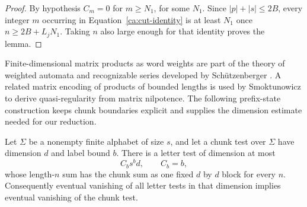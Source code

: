 \begin{proof}
By hypothesis $C_m=0$ for $m\geq N_1$, for some $N_1$.  Since
$|p|+|s|\leq2B$, every integer $m$ occurring in
Equation~\eqref{ca:cut-identity} is at least $N_1$ once
$n\geq2B+L_jN_1$.  Taking $n$ also large enough for that identity proves
the lemma.
\end{proof}

Finite-dimensional matrix products as word weights are part of the
theory of weighted automata and recognizable series developed by
Sch\"utzenberger \cite{Schutzenberger1961}. A related matrix encoding of
products of bounded lengths is used by Smoktunowicz
\cite[Sections~6 and~7]{Smoktunowicz2008} to derive quasi-regularity from
matrix nilpotence. The following prefix-state
construction keeps chunk boundaries explicit and supplies the dimension
estimate needed for our reduction.

\begin{lemma}
\label{ca:automaton}
Let $\Sigma$ be a nonempty finite alphabet of size $s$, and let a chunk
test over $\Sigma$ have dimension $d$ and label bound $b$.  There is a
letter test of dimension at most
\begin{equation}
  C_b s^b d,\qquad C_b=b,
  \label{ca:automaton-bound}
\end{equation}
whose length-$n$ sum has the chunk sum as one fixed $d$ by $d$ block for
every $n$.  Consequently eventual vanishing of all letter tests in that
dimension implies eventual vanishing of the chunk test.
\end{lemma}

